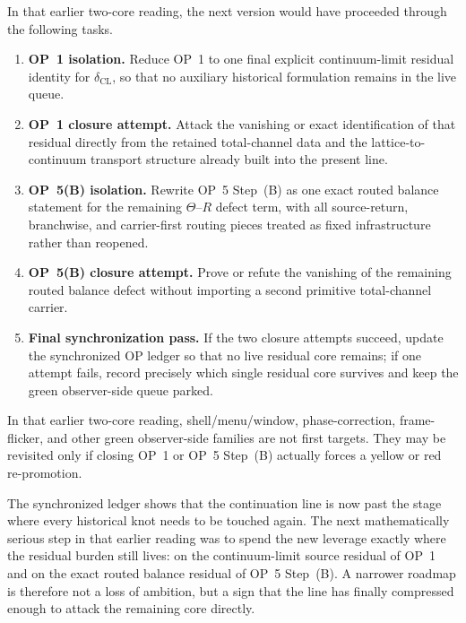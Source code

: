 \begin{proposition}
In that earlier two-core reading, the next version would have proceeded through the following tasks.
\begin{enumerate}[leftmargin=2em]
 \item \textbf{OP~1 isolation.} Reduce OP~1 to one final explicit continuum-limit residual identity for \(\delta_{\mathrm{CL}}\), so that no auxiliary historical formulation remains in the live queue.
 \item \textbf{OP~1 closure attempt.} Attack the vanishing or exact identification of that residual directly from the retained total-channel data and the lattice-to-continuum transport structure already built into the present line.
 \item \textbf{OP~5(B) isolation.} Rewrite OP~5 Step~(B) as one exact routed balance statement for the remaining \(\Theta\)--\(R\) defect term, with all source-return, branchwise, and carrier-first routing pieces treated as fixed infrastructure rather than reopened.
 \item \textbf{OP~5(B) closure attempt.} Prove or refute the vanishing of the remaining routed balance defect without importing a second primitive total-channel carrier.
 \item \textbf{Final synchronization pass.} If the two closure attempts succeed, update the synchronized OP ledger so that no live residual core remains; if one attempt fails, record precisely which single residual core survives and keep the green observer-side queue parked.
\end{enumerate}
\end{proposition}

\begin{corollary}
In that earlier two-core reading, shell/menu/window, phase-correction, frame-flicker, and other green observer-side families are not first targets. They may be revisited only if closing OP~1 or OP~5 Step~(B) actually forces a yellow or red re-promotion.
\end{corollary}

\begin{remark}
The synchronized ledger shows that the continuation line is now past the stage where every historical knot needs to be touched again. The next mathematically serious step in that earlier reading was to spend the new leverage exactly where the residual burden still lives: on the continuum-limit source residual of OP~1 and on the exact routed balance residual of OP~5 Step~(B). A narrower roadmap is therefore not a loss of ambition, but a sign that the line has finally compressed enough to attack the remaining core directly.
\end{remark}




